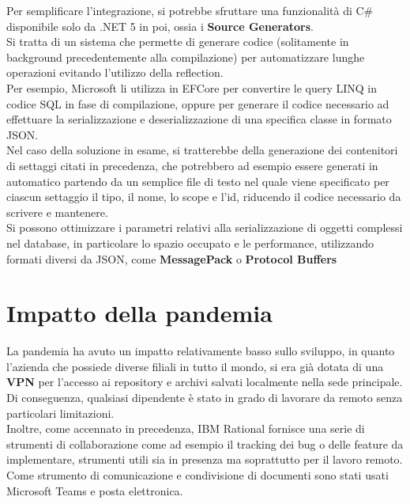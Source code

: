 \documentclass[\main/main.tex]{subfiles}
\begin{document}
Per semplificare l'integrazione, si potrebbe sfruttare una funzionalità di C\# disponibile solo da .NET 5 in poi, ossia i \textbf{Source Generators}.\\
Si tratta di un sistema che permette di generare codice (solitamente in background precedentemente alla compilazione) per automatizzare lunghe operazioni evitando l'utilizzo della reflection.\\
Per esempio, Microsoft li utilizza in EFCore per convertire le query LINQ in codice SQL in fase di compilazione, oppure per generare il codice necessario ad effettuare la serializzazione e deserializzazione di una specifica classe in formato JSON.\\
Nel caso della soluzione in esame, si tratterebbe della generazione dei contenitori di settaggi citati in precedenza, che potrebbero ad esempio essere generati in automatico partendo da un semplice file di testo nel quale viene specificato per ciascun settaggio il tipo, il nome, lo scope e l'id, riducendo il codice necessario da scrivere e mantenere.\\

Si possono ottimizzare i parametri relativi alla serializzazione di oggetti complessi nel database, in particolare lo spazio occupato e le performance, utilizzando formati diversi da JSON, come \textbf{MessagePack} \cite{messagepack} o \textbf{Protocol Buffers} \cite{protobuf}\\

\section{Impatto della pandemia}
La pandemia ha avuto un impatto relativamente basso sullo sviluppo, in quanto l'azienda che possiede diverse filiali in tutto il mondo, si era già dotata di una \textbf{VPN} per l'accesso ai repository e archivi salvati localmente nella sede principale.\\
Di conseguenza, qualsiasi dipendente è stato in grado di lavorare da remoto senza particolari limitazioni.\\
Inoltre, come accennato in precedenza, IBM Rational fornisce una serie di strumenti di collaborazione come ad esempio il tracking dei bug o delle feature da implementare, strumenti utili sia in presenza ma soprattutto per il lavoro remoto.\\
Come strumento di comunicazione e condivisione di documenti sono stati usati Microsoft Teams e posta elettronica.\\
\end{document}

